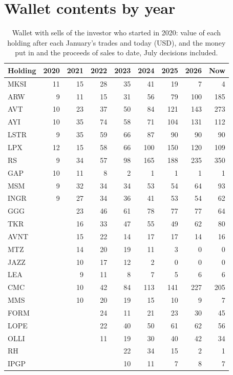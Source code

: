 \documentclass[11pt,a4paper]{article}
\begin{document}
\section{Wallet contents by year}
\label{app:contents}
{\small
\begin{longtable}{l r r r r r r r r }
\caption{Wallet with sells of the investor who started in 2020: value of each holding after each January's trades and today (USD), and the money put in and the proceeds of sales to date, July decisions included.}\label{tab:contents}\\
\hline
Holding & 2020 & 2021 & 2022 & 2023 & 2024 & 2025 & 2026 & Now \\
\hline
\endhead
MKSI & 11 & 15 & 28 & 35 & 41 & 19 & 7 & 4 \\
ARW & 9 & 11 & 15 & 31 & 56 & 79 & 100 & 185 \\
AVT & 10 & 23 & 37 & 50 & 84 & 121 & 143 & 273 \\
AYI & 10 & 35 & 74 & 58 & 71 & 104 & 131 & 112 \\
LSTR & 9 & 35 & 59 & 66 & 87 & 90 & 90 & 90 \\
LPX & 12 & 15 & 58 & 66 & 100 & 150 & 120 & 109 \\
RS & 9 & 34 & 57 & 98 & 165 & 188 & 235 & 350 \\
GAP & 10 & 11 & 8 & 2 & 1 & 1 & 1 & 1 \\
MSM & 9 & 32 & 34 & 34 & 53 & 54 & 64 & 93 \\
INGR & 9 & 27 & 34 & 36 & 41 & 53 & 54 & 62 \\
GGG &  & 23 & 46 & 61 & 78 & 77 & 77 & 64 \\
TKR &  & 16 & 33 & 47 & 55 & 49 & 62 & 80 \\
AVNT &  & 15 & 22 & 14 & 17 & 17 & 14 & 16 \\
MTZ &  & 14 & 20 & 19 & 11 & 3 & 0 & 0 \\
JAZZ &  & 10 & 17 & 12 & 2 & 0 & 0 & 0 \\
LEA &  & 9 & 11 & 8 & 7 & 5 & 6 & 6 \\
CMC &  & 10 & 42 & 84 & 113 & 141 & 227 & 205 \\
MMS &  & 10 & 20 & 19 & 15 & 10 & 9 & 7 \\
FORM &  &  & 24 & 11 & 21 & 23 & 30 & 45 \\
LOPE &  &  & 22 & 40 & 50 & 61 & 62 & 56 \\
OLLI &  &  & 11 & 19 & 30 & 40 & 42 & 34 \\
RH &  &  &  & 22 & 34 & 15 & 2 & 1 \\
IPGP &  &  &  & 10 & 11 & 7 & 8 & 7 \\

\end{longtable}}
\end{document}
